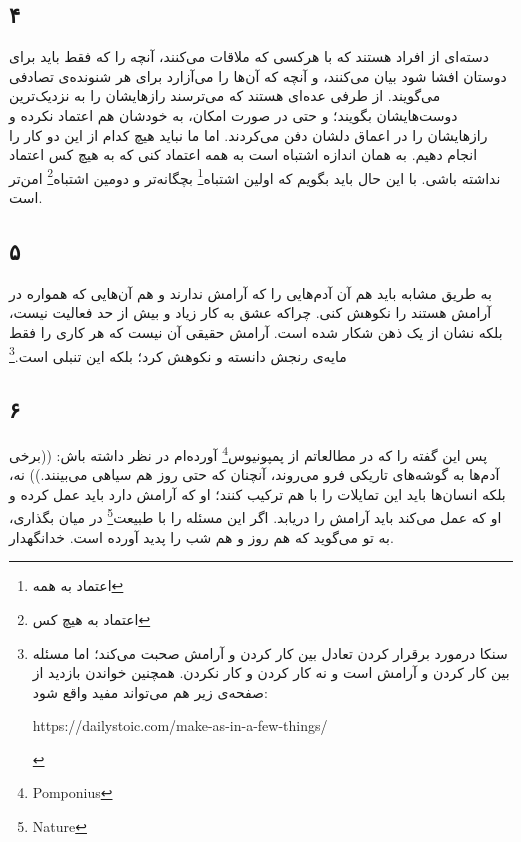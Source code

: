 \documentclass{article}
\begin{document}
    \subsection*{۴}
    دسته‌ای از افراد هستند که با هرکسی که ملاقات می‌کنند، آنچه را که فقط باید برای دوستان افشا شود بیان می‌کنند، و آنچه که آن‌ها را می‌آزارد برای هر شنونده‌ی تصادفی می‌گویند.
    از طرفی عده‌ای هستند که می‌ترسند رازهایشان را به نزدیک‌ترین دوست‌هایشان بگویند؛ و حتی در صورت امکان، به خودشان هم اعتماد نکرده و رازهایشان را در اعماق دلشان دفن می‌کردند.
    اما ما نباید هیچ کدام از این دو کار را انجام دهیم.
    به همان اندازه اشتباه است به همه اعتماد کنی که به هیچ کس اعتماد نداشته باشی.
    با این حال باید بگویم که اولین اشتباه\footnote{اعتماد به همه} بچگانه‌تر و دومین اشتباه\footnote{اعتماد به هیچ کس} امن‌تر است.
    \subsection*{۵}
    به طریق مشابه باید هم آن آدم‌هایی را که آرامش ندارند و هم آن‌هایی که همواره در آرامش هستند را نکوهش کنی.
    چراکه عشق به کار زیاد و بیش از حد فعالیت نیست، بلکه نشان از یک ذهن شکار شده است.
    آرامش حقیقی آن نیست که هر کاری را فقط مایه‌ی رنجش دانسته و نکوهش کرد؛ بلکه این تنبلی است.\footnote{سنکا درمورد برقرار کردن تعادل بین کار کردن و آرامش صحبت می‌کند؛ اما مسئله بین کار کردن و آرامش است و نه کار کردن و کار نکردن. همچنین خواندن بازدید از صفحه‌ی زیر هم می‌تواند مفید واقع شود:\newline \begin{LTR}https://dailystoic.com/make-as-in-a-few-things/\end{LTR}}
    \subsection*{۶}
    پس این گفته را که در مطالعاتم از پمپونیوس\footnote{Pomponius} آورده‌ام در نظر داشته باش: ((برخی آدم‌ها به گوشه‌های تاریکی فرو می‌روند، آنچنان که حتی روز هم سیاهی می‌بینند.))
    نه، بلکه انسان‌ها باید این تمایلات را با هم ترکیب کنند؛ او که آرامش دارد باید عمل کرده و او که عمل می‌کند باید آرامش را دریابد.
    اگر این مسئله را با طبیعت\footnote{Nature} در میان بگذاری،‌ به تو می‌گوید که هم روز و هم شب را پدید آورده است.
    خدانگهدار.
\end{document}
